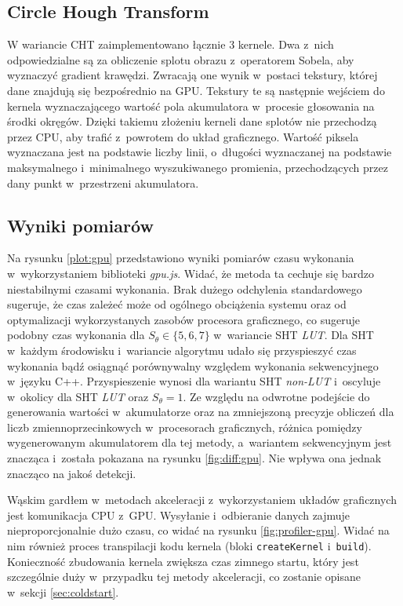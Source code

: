 \subsection{Circle Hough Transform}

W wariancie CHT zaimplementowano łącznie 3 kernele. Dwa z~nich odpowiedzialne są za obliczenie splotu obrazu z~operatorem Sobela, aby wyznaczyć gradient krawędzi. Zwracają one wynik w~postaci tekstury, której dane znajdują się bezpośrednio na GPU. Tekstury te są następnie wejściem do kernela wyznaczającego wartość pola akumulatora w~procesie głosowania na środki okręgów. Dzięki takiemu złożeniu kerneli dane splotów nie przechodzą przez CPU, aby trafić z~powrotem do układ graficznego. Wartość piksela wyznaczana jest na podstawie liczby linii, o~długości wyznaczanej na podstawie maksymalnego i~minimalnego wyszukiwanego promienia, przechodzących przez dany punkt w~przestrzeni akumulatora.

\subsection{Wyniki pomiarów}

Na rysunku \ref{plot:gpu} przedstawiono wyniki pomiarów czasu wykonania w~wykorzystaniem biblioteki \textit{gpu.js}. Widać, że metoda ta cechuje się bardzo niestabilnymi czasami wykonania. Brak dużego odchylenia standardowego sugeruje, że czas zależeć może od ogólnego obciążenia systemu oraz od optymalizacji wykorzystanych zasobów procesora graficznego, co sugeruje podobny czas wykonania dla $S_\theta \in \{5,6,7\}$ w~wariancie SHT \textit{LUT}. Dla SHT w~każdym środowisku i~wariancie algorytmu udało się przyspieszyć czas wykonania bądź osiągnąć porównywalny względem wykonania sekwencyjnego w~języku C++. Przyspieszenie wynosi  dla wariantu SHT \textit{non-LUT} i~oscyluje w~okolicy  dla SHT \textit{LUT} oraz $S_\theta = 1$. Ze względu na odwrotne podejście do generowania wartości w~akumulatorze oraz na zmniejszoną precyzje obliczeń dla liczb zmiennoprzecinkowych w~procesorach graficznych, różnica pomiędzy wygenerowanym akumulatorem dla tej metody, a~wariantem sekwencyjnym jest znacząca i~została pokazana na rysunku \ref{fig:diff:gpu}. Nie wpływa ona jednak znacząco na jakoś detekcji. 

Wąskim gardłem w~metodach akceleracji z~wykorzystaniem układów graficznych jest komunikacja CPU z~GPU. Wysyłanie i~odbieranie danych zajmuje nieproporcjonalnie dużo czasu, co widać na rysunku \ref{fig:profiler-gpu}. Widać na nim również proces transpilacji kodu kernela (bloki \lstinline{createKernel} i~\lstinline{build}). Konieczność zbudowania kernela zwiększa czas zimnego startu, który jest szczególnie duży w~przypadku tej metody akceleracji, co zostanie opisane w~sekcji \ref{sec:coldstart}.

